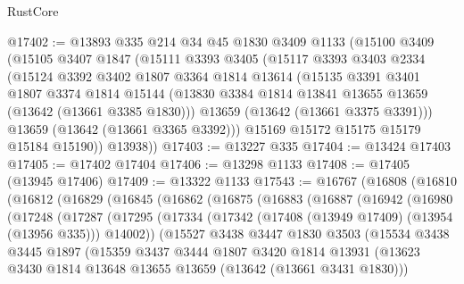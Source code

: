 \begin{lexlean}{RustCore}
\begin{coremodule}
@17402 := @13893
    @335
    @214
    @34
    @45
    @1830
    @3409
    @1133
    (@15100
      @3409
      (@15105
        @3407
        @1847
        (@15111
          @3393
          @3405
          (@15117
            @3393
            @3403
            @2334
            (@15124
              @3392
              @3402
              @1807
              @3364
              @1814
              @13614
              (@15135
                @3391
                @3401
                @1807
                @3374
                @1814
                @15144
                (@13830 @3384 @1814 @13841 @13655 @13659 (@13642 (@13661 @3385 @1830)))
                @13659
                (@13642 (@13661 @3375 @3391)))
              @13659
              (@13642 (@13661 @3365 @3392)))
            @15169
            @15172
            @15175
            @15179
            @15184
            @15190))
        @13938))
@17403 := @13227 @335
@17404 := @13424 @17403
@17405 := @17402 @17404
@17406 := @13298 @1133
@17408 := @17405 (@13945 @17406)
@17409 := @13322 @1133
@17543 := @16767
    (@16808
      (@16810
        (@16812
          (@16829
            (@16845
              (@16862
                (@16875
                  (@16883
                    (@16887
                      (@16942
                        (@16980
                          (@17248
                            (@17287
                              (@17295
                                (@17334
                                  (@17342 (@17408 (@13949 @17409) (@13954 (@13956 @335))) @14002))
                                (@15527
                                  @3438
                                  @3447
                                  @1830
                                  @3503
                                  (@15534
                                    @3438
                                    @3445
                                    @1897
                                    (@15359
                                      @3437
                                      @3444
                                      @1807
                                      @3420
                                      @1814
                                      @13931
                                      (@13623
                                        @3430
                                        @1814
                                        @13648
                                        @13655
                                        @13659
                                        (@13642 (@13661 @3431 @1830)))

\end{coremodule}
\end{lexlean}
